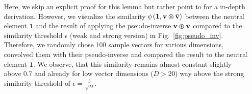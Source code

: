 Here, we skip an explicit proof for this lemma but rather point to \textcite[Section 3.1.2 and 3.1.3]{Plate1994} for a in-depth derivation.
However, we visualize the similarity $\phi\left(\mathbf{1}, \mathbf{v} \varoast \bar{\mathbf{v}}\right)$ between the neutral element $\mathbf{1}$ and the result of applying the pseudo-inverse $ \mathbf{v} \varoast \bar{\mathbf{v}}$ compared to the similarity threshold $\epsilon$ (weak and strong version) in Fig.~\ref{fig:pseudo_inv}.
Therefore, we randomly chose \num{100} sample vectors for various dimensions, convolved them with their pseudo-inverse and compared the result to the neutral element $\mathbf{1}$.
We observe, that this similarity remains almost constant slightly above \num{0.7} and already for low vector dimensions ($D > 20$) way above the strong similarity threshold of $\epsilon=\frac{3}{\sqrt{D}}$.

